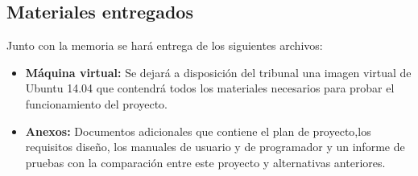 \subsection{Materiales entregados}
Junto con la memoria se hará entrega de los siguientes archivos:
	\begin{itemize}
	\item \textbf{Máquina virtual:} Se dejará a disposición del tribunal una imagen virtual de Ubuntu 14.04 que contendrá todos los materiales necesarios para probar el funcionamiento del proyecto.
	\item \textbf{Anexos:} Documentos adicionales que contiene el plan de proyecto,los requisitos diseño, los manuales de usuario y de programador y un informe de pruebas con la comparación entre este proyecto y alternativas anteriores.
	\end{itemize}
